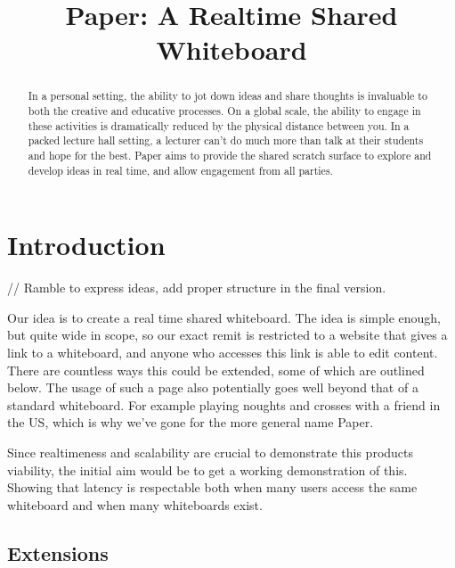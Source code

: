 \documentclass[conference]{IEEEtran}
\begin{document}
\newcommand{\name}{Paper}

\title{\name{}: A Realtime Shared Whiteboard}

\author{
}

\maketitle

\begin{abstract}
In a personal setting, the ability to jot down ideas and share thoughts is
invaluable to both the creative and educative processes. On a global scale, the
ability to engage in these activities is dramatically reduced by the physical
distance between you. In a packed lecture hall setting, a lecturer can't do much
more than talk at their students and hope for the best. \name{} aims to provide
the shared scratch surface to explore and develop ideas in real time, and allow
engagement from all parties.
\end{abstract}

\section{Introduction}
// Ramble to express ideas, add proper structure in the final version.

Our idea is to create a real time shared whiteboard. The idea is simple enough,
but quite wide in scope, so our exact remit is restricted to a website that
gives a link to a whiteboard, and anyone who accesses this link is able to edit
content. There are countless ways this could be extended, some of which are
outlined below. The usage of such a page also potentially goes well beyond that
of a standard whiteboard. For example playing noughts and crosses with a friend
in the US, which is why we've gone for the more general name \name{}.

Since realtimeness and scalability are crucial to demonstrate this products
viability, the initial aim would be to get a working demonstration of this.
Showing that latency is respectable both when many users access the same
whiteboard and when many whiteboards exist.

\subsection{Extensions}
\end{document}
